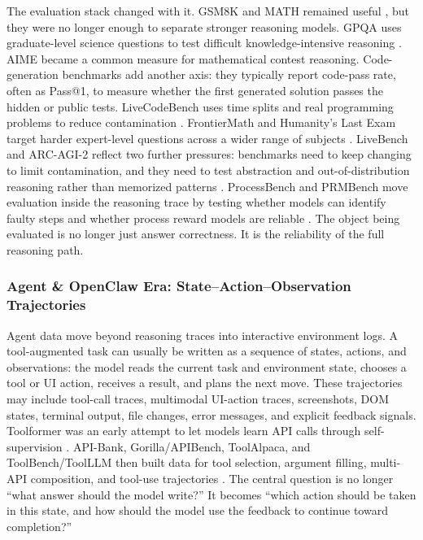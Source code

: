 The evaluation stack changed with it. GSM8K and MATH remained useful \citep{cobbe2021gsm8k,hendrycks2021math}, but they were no longer enough to separate stronger reasoning models. GPQA uses graduate-level science questions to test difficult knowledge-intensive reasoning \citep{rein2023gpqa}. AIME became a common measure for mathematical contest reasoning. Code-generation benchmarks add another axis: they typically report code-pass rate, often as Pass@1, to measure whether the first generated solution passes the hidden or public tests. LiveCodeBench uses time splits and real programming problems to reduce contamination \citep{jain2024livecodebench}. FrontierMath and Humanity's Last Exam target harder expert-level questions across a wider range of subjects \citep{glazer2024frontiermath,phan2025hle}. LiveBench and ARC-AGI-2 reflect two further pressures: benchmarks need to keep changing to limit contamination, and they need to test abstraction and out-of-distribution reasoning rather than memorized patterns \citep{white2024livebench,chollet2025arcagi2}. ProcessBench and PRMBench move evaluation inside the reasoning trace by testing whether models can identify faulty steps and whether process reward models are reliable \citep{zheng2024processbench,song2025prmbench}. The object being evaluated is no longer just answer correctness. It is the reliability of the full reasoning path.


\subsubsection{Agent \& OpenClaw Era: State--Action--Observation Trajectories}



Agent data move beyond reasoning traces into interactive environment logs. A tool-augmented task can usually be written as a sequence of states, actions, and observations: the model reads the current task and environment state, chooses a tool or UI action, receives a result, and plans the next move. These trajectories may include tool-call traces, multimodal UI-action traces, screenshots, DOM states, terminal output, file changes, error messages, and explicit feedback signals. Toolformer was an early attempt to let models learn API calls through self-supervision \citep{schick2023toolformer}. API-Bank, Gorilla/APIBench, ToolAlpaca, and ToolBench/ToolLLM then built data for tool selection, argument filling, multi-API composition, and tool-use trajectories \citep{li2023apibank,patil2023gorilla,tang2023toolalpaca,qin2023toolllm,meng2026clawmarklivingworldbenchmarkmultiturn}. The central question is no longer ``what answer should the model write?'' It becomes ``which action should be taken in this state, and how should the model use the feedback to continue toward completion?''

